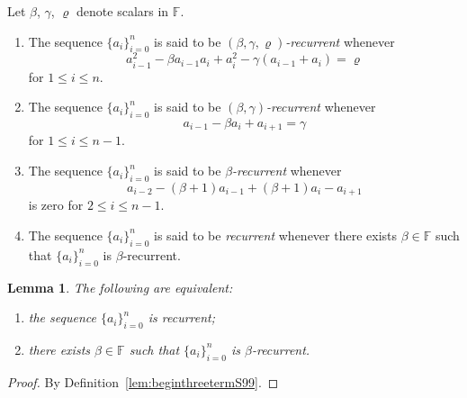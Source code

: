\documentclass[pdftex]{sigma}
\numberwithin{equation}{section}
\newtheorem{Lemma}[Theorem]{Lemma}
\begin{document}
\begin{Definition}\label{lem:beginthreetermS99}
Let $\beta$, $\gamma$, $\varrho$ denote scalars
in $\mathbb F$.
\begin{enumerate}\itemsep=0pt
\item[(i)] The sequence
 $\lbrace a_i\rbrace_{i=0}^n$
is said to be {\it $(\beta,\gamma,\varrho)$-recurrent} whenever
\begin{equation}
a^2_{i-1}-\beta a_{i-1}a_i+a^2_i
-\gamma (a_{i-1} +a_i)=\varrho
\label{eq:varrhothreetermS99}
\end{equation}
 for
$1 \leq i \leq n$.
\item[(ii)] The sequence
 $\lbrace a_i\rbrace_{i=0}^n$
is said to be {\it $(\beta,\gamma)$-recurrent} whenever
\begin{equation}
a_{i-1}-\beta a_i+a_{i+1}=\gamma
\label{eq:gammathreetermS99}
\end{equation}
 for
$1 \leq i \leq n-1$.
\item[(iii)] The sequence
 $\lbrace a_i\rbrace_{i=0}^n$
is said to be {\it $\beta$-recurrent} whenever
\begin{equation}
a_{i-2}-(\beta+1)a_{i-1}+(\beta +1)a_i -a_{i+1}
\label{eq:betarecS99}
\end{equation}
is zero for
$2 \leq i \leq n-1$.
\item[(iv)] The sequence
 $\lbrace a_i\rbrace_{i=0}^n$
is said to be {\it recurrent} whenever there exists
$\beta \in \mathbb F$ such that
 $\lbrace a_i\rbrace_{i=0}^n$ is $\beta$-recurrent.
\end{enumerate}
\end{Definition}

\begin{Lemma}\label{lem:recvsbrecS99}
The following are equivalent:
\begin{enumerate}\itemsep=0pt
\item[$(i)$] the sequence
 $\lbrace a_i\rbrace_{i=0}^n$
is recurrent;
\item[$(ii)$]
there exists $\beta \in \mathbb F$ such that
 $\lbrace a_i\rbrace_{i=0}^n$
 is $\beta$-recurrent.
\end{enumerate}
\end{Lemma}
\begin{proof} By Definition~\ref{lem:beginthreetermS99}.
\end{proof}
\end{document}
